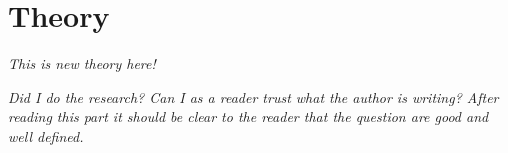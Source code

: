 \chapter{Theory}\label{cha:theory}

\textit{This is new theory here!}

\textit{Did I do the research? Can I as a reader trust what the author is writing? After reading this part it should be clear to the reader that the question are good and well defined.}






